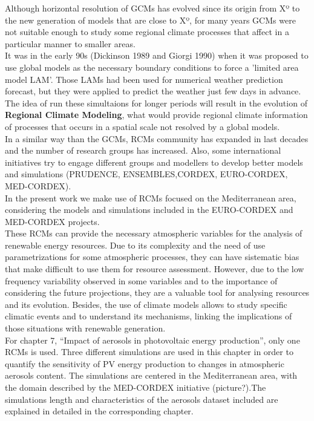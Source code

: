 Although horizontal resolution of GCMs has evolved since its origin from Xº to the new generation of models that are close to Xº, for many years GCMs were not suitable enough to study some regional climate processes that affect in a particular manner to smaller areas.\\

It was in the early 90s (Dickinson 1989 and Giorgi 1990) when it was proposed to use global models as the necessary boundary conditions to force a 'limited area model LAM'. Those LAMs had been used for numerical weather prediction forecast, but they were applied to predict the weather just few days in advance. The idea of run these simultaions for longer periods will result in the evolution of \textbf{Regional Climate Modeling}, what would provide regional climate information of processes that occurs in a spatial scale not resolved by a global models.\\

In a similar way than the GCMs, RCMs community has expanded in last decades and the number of research groups has increased. Also, some international initiatives try to engage different groups and modellers to develop better models and simulations (PRUDENCE, ENSEMBLES,CORDEX, EURO-CORDEX, MED-CORDEX).\\

In the present work we make use of RCMs focused on the Mediterranean area, considering the models and simulations included in the EURO-CORDEX and MED-CORDEX projects.\\

These RCMs can provide the necessary atmospheric variables for the analysis of renewable energy resources. Due to its complexity and the need of use parametrizations for some atmospheric processes, they can have sistematic bias that make difficult to use them for resource assessment. However, due to the low frequency variability observed in some variables and to the importance of considering the future projections, they are a valuable tool for analysing resources and its evolution. Besides, the use of climate models allows to study specific climatic events and to understand its mechanisms, linking the implications of those situations with renewable generation.\\

For chapter 7, ``Impact of aerosols in photovoltaic energy production'', only one RCMs is used. Three different simulations are used in this chapter in order to quantify the sensitivity of PV energy production to changes in atmospheric aerosols content. The simulations are centered in the Mediterranean area, with the domain described by the MED-CORDEX initiative (picture?).The simulations length and characteristics of the aerosols dataset included are explained in detailed in the corresponding chapter.\\

